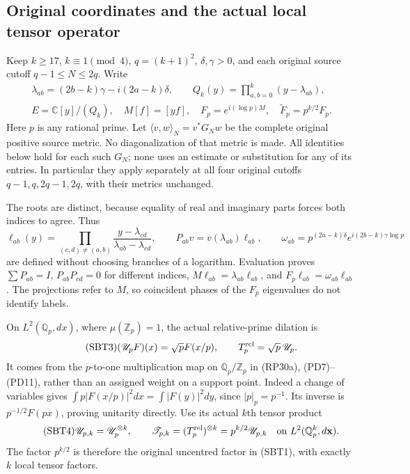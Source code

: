 \documentclass[11pt]{article}
\begin{document}
\subsection{Original coordinates and the actual local tensor operator}

Keep $k\ge17$, $k\equiv1\pmod4$, $q=(k+1)^2$, $\delta,\gamma>0$,
and each original source cutoff $q-1\le N\le2q$. Write
\begin{equation}\tag{SBT1}
\begin{gathered}
 \lambda_{ab}=(2b-k)\gamma-i(2a-k)\delta,\qquad
 Q_k(y)=\prod_{a,b=0}^k(y-\lambda_{ab}),\\
 E=\mathbb C[y]/(Q_k),\quad M[f]=[yf],\quad
 F_p=e^{i(\log p)M},\quad \widetilde F_p=p^{k/2}F_p .
\end{gathered}
\end{equation}
Here $p$ is any rational prime. Let $\langle v,w\rangle_N=v^*G_Nw$
be the complete original positive source metric. No diagonalization of
that metric is made. All identities below hold for each such $G_N$;
none uses an estimate or substitution for any of its entries. In
particular they apply separately at all four original cutoffs
$q-1,q,2q-1,2q$, with their metrics unchanged.

The roots are distinct, because equality of real and imaginary parts
forces both indices to agree. Thus
\begin{equation}\tag{SBT2}
 \ell_{ab}(y)=\prod_{(c,d)\ne(a,b)}
       \frac{y-\lambda_{cd}}{\lambda_{ab}-\lambda_{cd}},\qquad
 P_{ab}v=v(\lambda_{ab})\ell_{ab},\qquad
 \omega_{ab}=p^{(2a-k)\delta}e^{i(2b-k)\gamma\log p}
\end{equation}
are defined without choosing branches of a logarithm. Evaluation proves
$\sum P_{ab}=I$, $P_{ab}P_{cd}=0$ for different indices,
$M\ell_{ab}=\lambda_{ab}\ell_{ab}$, and
$F_p\ell_{ab}=\omega_{ab}\ell_{ab}$. The projections refer to $M$,
so coincident phases of the $F_p$ eigenvalues do not identify labels.

On $L^2(\mathbb Q_p,dx)$, where $\mu(\mathbb Z_p)=1$, the actual
relative-prime dilation is
\begin{equation}\tag{SBT3}
 (\mathscr U_pF)(x)=\sqrt p F(x/p),\qquad
 T_p^{\rm rel}=\sqrt p\,\mathscr U_p .
\end{equation}
It comes from the $p$-to-one multiplication map on
$\mathbb Q_p/\mathbb Z_p$ in (RP30a), (PD7)--(PD11), rather than an
assigned weight on a support point. Indeed a change of variables gives
$\int p|F(x/p)|^2dx=\int|F(y)|^2dy$, since $|p|_p=p^{-1}$.
Its inverse is $p^{-1/2}F(px)$, proving unitarity directly.
Use its actual $k$th tensor product
\begin{equation}\tag{SBT4}
 \mathscr U_{p,k}=\mathscr U_p^{\otimes k},\qquad
 \mathscr T_{p,k}=(T_p^{\rm rel})^{\otimes k}
       =p^{k/2}\mathscr U_{p,k}
       \quad\hbox{on }L^2(\mathbb Q_p^k,d\mathbf x).
\end{equation}
The factor $p^{k/2}$ is therefore the original uncentred factor in
(SBT1), with exactly $k$ local tensor factors.
\end{document}
